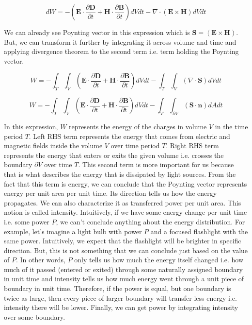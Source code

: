 \documentclass{article}
\begin{document}
\[ dW = -(\mathbf{E} \cdot \frac{\partial \mathbf{D}}{\partial t} + \mathbf{H} \cdot \frac{\partial \mathbf{B}}{\partial t})dVdt - \nabla \cdot (\mathbf{E} \times \mathbf{H})dVdt \]

We can already see Poynting vector in this expression which is $\mathbf{S} = (\mathbf{E} \times \mathbf{H})$. But, we can transform it further by integrating it across volume and time and applying divergence theorem to the second term i.e. term holding the Poynting vector.

\[ W = -\int_{T}\int_{V}(\mathbf{E} \cdot \frac{\partial \mathbf{D}}{\partial t} + \mathbf{H} \cdot \frac{\partial \mathbf{B}}{\partial t})dVdt - \int_{T}\int_{V}(\nabla \cdot \mathbf{S}) dVdt \]

\[ W = -\int_{T}\int_{V}(\mathbf{E} \cdot \frac{\partial \mathbf{D}}{\partial t} + \mathbf{H} \cdot \frac{\partial \mathbf{B}}{\partial t})dVdt - \int_{T}\int_{\partial V}(\mathbf{S} \cdot \mathbf{n} )dAdt \]

In this expression, $W$ represents the energy of the charges in volume $V$ in the time period $T$. Left RHS term represents the energy that comes from electric and magnetic fields inside the volume $V$ over time period $T$. Right RHS term represents the energy that enters or exits the given volume i.e. crosses the boundary $\partial V$ over time $T$. This second term is more important for us because that is what describes the energy that is dissipated by light sources. From the fact that this term is energy, we can conclude that the Poynting vector represents energy per unit area per unit time. Its direction tells us how the energy propagates. We can also characterize it as transferred power per unit area. This notion is called intensity. Intuitively, if we have some energy change per unit time i.e. some power $P$, we can't conclude anything about the energy distribution. For example, let's imagine a light bulb with power $P$ and a focused flashlight with the same power. Intuitively, we expect that the flashlight will be brighter in specific direction. But, this is not something that we can conclude just based on the value of $P$. In other words, $P$ only tells us how much the energy itself changed i.e. how much of it passed (entered or exited) through some naturally assigned boundary in unit time and intensity tells us how much energy went through a unit piece of boundary in unit time. Therefore, if the power is equal, but one boundary is twice as large, then every piece of larger boundary will transfer less energy i.e. intensity there will be lower. Finally, we can get power by integrating intensity over some boundary.
\end{document}
